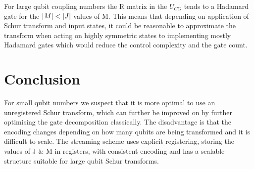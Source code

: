 \documentclass[12pt]{article}
\begin{document}
For large qubit coupling numbers the R matrix in the $U_{CG}$ tends to a Hadamard gate for the $\abs{M} < \abs{J}$ values of M. This means that depending on application of Schur transform and input states, it could be reasonable to approximate the transform when acting on highly symmetric states to implementing mostly Hadamard gates which would reduce the control complexity and the gate count.

\section{Conclusion}

For small qubit numbers we suspect that it is more optimal to use an unregistered Schur transform, which can further be improved on by further optimising the gate decomposition classically. The disadvantage is that the encoding changes depending on how many qubits are being transformed and it is difficult to scale. The streaming scheme uses explicit registering, storing the values of J \& M in registers, with consistent encoding and has a scalable structure suitable for large qubit Schur transforms.




\newpage

\begin{landscape}

\end{landscape}

\end{document}
